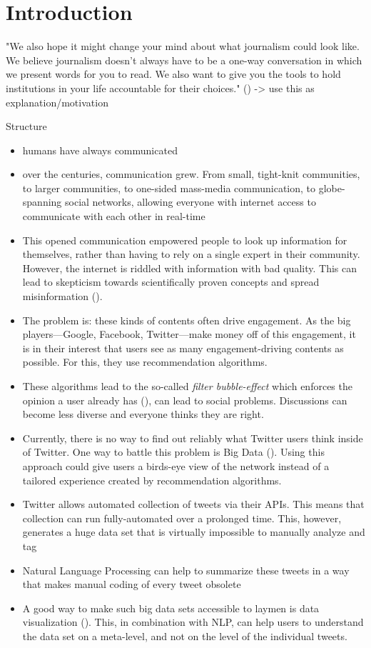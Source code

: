 \section{Introduction}
"We also hope it might change your mind about what journalism could look like. We believe journalism doesn’t always have to be a one-way conversation in which we present words for you to read. We also want to give you the tools to hold institutions in your life accountable for their choices." (\cite{angwinMakingPrivacyPersonal2020}) -> use this as explanation/motivation

Structure
\begin{itemize}
    \item humans have always communicated
    \item over the centuries, communication grew. From small, tight-knit communities, to larger communities, to one-sided mass-media communication, to globe-spanning social networks, allowing everyone with internet access to communicate with each other in real-time
    \item This opened communication empowered people to look up information for themselves, rather than having to rely on a single expert in their community. However, the internet is riddled with information with bad quality. This can lead to skepticism towards scientifically proven concepts and spread misinformation (\cite{krimskyRiskCommunicationInternet2007}).
    \item The problem is: these kinds of contents often drive engagement. As the big players---Google, Facebook, Twitter---make money off of this engagement, it is in their interest that users see as many engagement-driving contents as possible. For this, they use recommendation algorithms.
    \item These algorithms lead to the so-called \emph{filter bubble-effect} which enforces the opinion a user already has (\cite{pariser2011filter}), can lead to social problems. Discussions can become less diverse and everyone thinks they are right.
    \item Currently, there is no way to find out reliably what Twitter users think inside of Twitter. One way to battle this problem is Big Data (\cite{crawfordCriticalQuestionsBig2012}). Using this approach could give users a birds-eye view of the network instead of a tailored experience created by recommendation algorithms.
    \item Twitter allows automated collection of tweets via their APIs. This means that collection can run fully-automated over a prolonged time. This, however, generates a huge data set that is virtually impossible to manually analyze and tag
    \item Natural Language Processing can help to summarize these tweets in a way that makes manual coding of every tweet obsolete
    \item A good way to make such big data sets accessible to laymen is data visualization (\cite{donalekImmersiveCollaborativeData2014}). This, in combination with NLP, can help users to understand the data set on a meta-level, and not on the level of the individual tweets.
\end{itemize}


